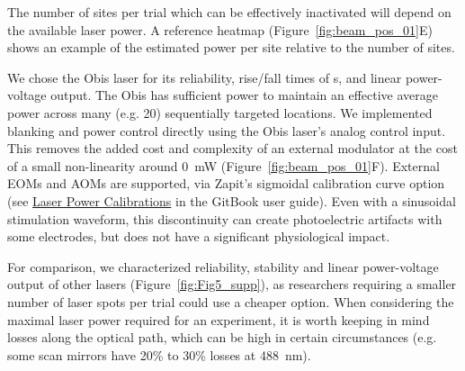 \documentclass[9pt,lineno]{elife}
\begin{document}
The number of sites per trial which can be effectively inactivated will depend on the available laser power.
A reference heatmap (Figure~\ref{fig:beam_pos_01}E) shows an example of the estimated power per site relative to the number of sites.

We chose the Obis laser for its reliability, rise/fall times of \textmu s, and linear power-voltage output.
The Obis has sufficient power to maintain an effective average power across many (e.g. 20) sequentially targeted locations.
We  implemented blanking and power control directly using the Obis laser's analog control input.
This removes the added cost and complexity of an external modulator at the cost of a small non-linearity around 0~mW (Figure~\ref{fig:beam_pos_01}F).
External EOMs and AOMs are supported, via Zapit's sigmoidal calibration curve option (see \href{https://zapit.swcmicroscopy.com/installation-and-setup/configuring-zapit/laser-power-calibration}{Laser Power Calibrations} in the GitBook user guide).
Even with a sinusoidal stimulation waveform, this discontinuity can create photoelectric artifacts with some electrodes, but does not have a significant physiological impact.

For comparison, we characterized reliability, stability and linear power-voltage output of other lasers (Figure~\ref{fig:Fig5_supp}), as researchers requiring a smaller number of laser spots per trial could use a cheaper option.
When considering the maximal laser power required for an experiment, it is worth keeping in mind losses along the optical path, which can be high in certain circumstances (e.g. some scan mirrors have 20\% to 30\% losses at 488~nm).
\end{document}
